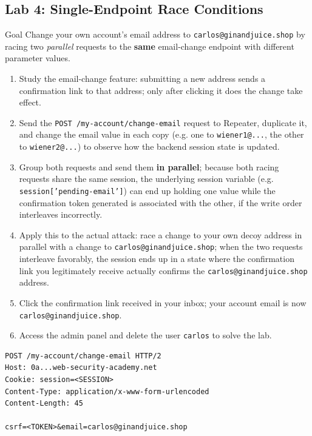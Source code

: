 \documentclass[11pt]{article}
\begin{document}
\subsection{Lab 4: Single-Endpoint Race Conditions}
\begin{labbox}{Goal}
Change your own account's email address to \texttt{carlos@ginandjuice.shop} by racing two \emph{parallel} requests to the \textbf{same} email-change endpoint with different parameter values.
\end{labbox}
\begin{enumerate}[leftmargin=1.2em]
  \item Study the email-change feature: submitting a new address sends a confirmation link to that address; only after clicking it does the change take effect.
  \item Send the \texttt{POST /my-account/change-email} request to Repeater, duplicate it, and change the email value in each copy (e.g. one to \texttt{wiener1@...}, the other to \texttt{wiener2@...}) to observe how the backend session state is updated.
  \item Group both requests and send them \textbf{in parallel}; because both racing requests share the same session, the underlying session variable (e.g. \texttt{session['pending-email']}) can end up holding one value while the confirmation token generated is associated with the other, if the write order interleaves incorrectly.
  \item Apply this to the actual attack: race a change to your own decoy address in parallel with a change to \texttt{carlos@ginandjuice.shop}; when the two requests interleave favorably, the session ends up in a state where the confirmation link you legitimately receive actually confirms the \texttt{carlos@ginandjuice.shop} address.
  \item Click the confirmation link received in your inbox; your account email is now \texttt{carlos@ginandjuice.shop}.
  \item Access the admin panel and delete the user \texttt{carlos} to solve the lab.
\end{enumerate}
\begin{lstlisting}[style=http]
POST /my-account/change-email HTTP/2
Host: 0a...web-security-academy.net
Cookie: session=<SESSION>
Content-Type: application/x-www-form-urlencoded
Content-Length: 45

csrf=<TOKEN>&email=carlos@ginandjuice.shop
\end{lstlisting}
\end{document}
